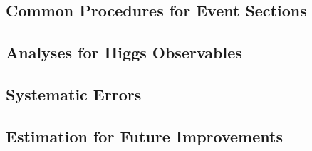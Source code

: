 


\subsection{Common Procedures for Event Sections}
\label{subsec:higgs_common}


\subsection{Analyses for Higgs Observables}
\label{subsec:higgs_ana}


% 

% 

\subsection{Systematic Errors}
\label{subsec:higgs_syst}



\subsection{Estimation for Future Improvements}
\label{subsec:higgs_improve}


